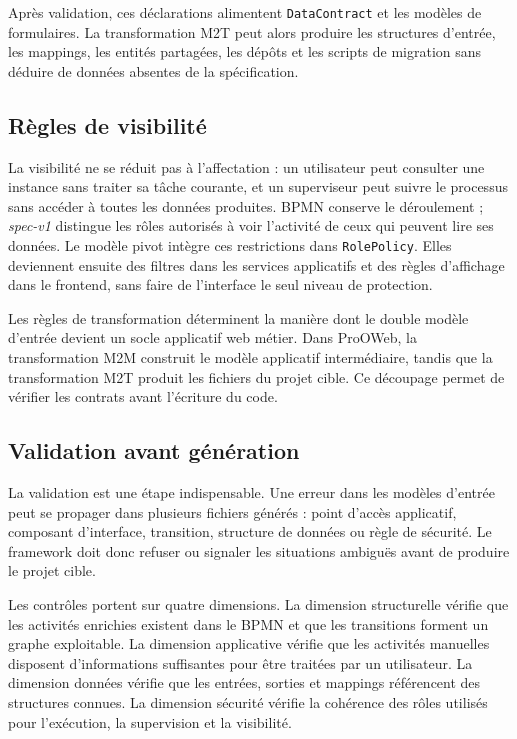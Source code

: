 Après validation, ces déclarations alimentent \texttt{DataContract} et les
modèles de formulaires. La transformation M2T peut alors produire les structures
d'entrée, les mappings, les entités partagées, les dépôts et les scripts de
migration sans déduire de données absentes de la spécification.


\subsection{Règles de visibilité}

La visibilité ne se réduit pas à l'affectation : un utilisateur peut consulter
une instance sans traiter sa tâche courante, et un superviseur peut suivre le
processus sans accéder à toutes les données produites. BPMN conserve le
déroulement ; \textit{spec-v1} distingue les rôles autorisés à voir l'activité
de ceux qui peuvent lire ses données. Le modèle pivot intègre ces restrictions
dans \texttt{RolePolicy}. Elles deviennent ensuite des filtres dans les services
applicatifs et des règles d'affichage dans le frontend, sans faire de l'interface
le seul niveau de protection.

\label{sec:chap3-transformations}

Les règles de transformation déterminent la manière dont le double modèle
d'entrée devient un socle applicatif web métier. Dans ProOWeb, la transformation
M2M construit le modèle applicatif intermédiaire, tandis que la transformation
M2T produit les fichiers du projet cible. Ce découpage permet de vérifier les
contrats avant l'écriture du code.

\subsection{Validation avant génération}

La validation est une étape indispensable. Une erreur dans les modèles d'entrée peut se propager dans plusieurs fichiers générés : point d'accès applicatif, composant d'interface, transition, structure de données ou règle de sécurité. Le framework doit donc refuser ou signaler les situations ambiguës avant de produire le projet cible.

Les contrôles portent sur quatre dimensions. La dimension structurelle vérifie que les activités enrichies existent dans le BPMN et que les transitions forment un graphe exploitable. La dimension applicative vérifie que les activités manuelles disposent d'informations suffisantes pour être traitées par un utilisateur. La dimension données vérifie que les entrées, sorties et mappings référencent des structures connues. La dimension sécurité vérifie la cohérence des rôles utilisés pour l'exécution, la supervision et la visibilité.

